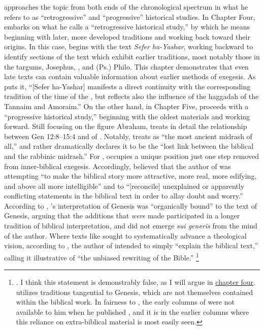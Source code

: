 \vermes approaches the topic from both ends of the chronological spectrum in what he refers to as ``retrogressive'' and ``progressive'' historical studies. In Chapter Four, \vermes embarks on what he calls a ``retrogressive historical study,'' by which he means beginning with later, more developed traditions and working back toward their origins. In this case, \vermes begins with the  text \emph{Sefer ha-Yashar}, working backward to identify sections of the text which exhibit earlier traditions, most notably those in the targums, Josephus, \jub, and (Ps.) Philo. This chapter demonstrates that even late texts can contain valuable information about earlier methods of exegesis. As \vermes puts it, ``[Sefer ha-Yashar] manifests a direct continuity with the corresponding tradition of the time of the \secondtemple, but reflects also the influence of the haggadah of the Tannaim and Amoraim.''%
    \autocite[95]{vermes1961}
On the other hand, in Chapter Five, \vermes proceeds with a ``progressive historical study,'' beginning with the oldest materials and working forward. Still focusing on the figure Abraham, \vermes treats in detail the relationship between Gen 12:8--15:4 and  of \ga. Notably, \vermes treats \ga as ``the most ancient midrash of all,''%
    \autocite[124]{vermes1961}
and rather dramatically declares it to be the ``lost link between the biblical and the rabbinic midrash.''%
    \autocite[124]{vermes1961}
For \vermes, \ga occupies a unique position just one step removed from inner-biblical exegesis. Accordingly, \vermes believed that the author of \ga was attempting ``to make the biblical story more attractive, more real, more edifying, and above all more intelligible'' and to ``[reconcile] unexplained or apparently conflicting statements in the biblical text in order to allay doubt and worry.''%
    \autocite[126]{vermes1961}
According to \vermes, \ga's interpretation of Genesis was ``organically bound'' to the text of Genesis, arguing that the additions that \emph{were} made participated in a longer tradition of biblical interpretation, and did not emerge \emph{sui generis} from the mind of the author. Where texts like \jub sought to systematically advance a theological vision, according to \vermes, the author of \ga intended to simply ``explain the biblical text,'' calling it illustrative of ``the unbiased rewriting of the Bible.''%
    \footnote{%
        \Cite[126]{vermes1961}. I think this statement is demonstrably false, as I will argue in \hyperref[chap:ga]{chapter four}. \GA utilizes traditions tangential to Genesis, which are not themselves contained within the biblical work. In fairness to \vermes, the early columns of \ga were not available to him when he published , and it is in the earlier columns where this reliance on extra-biblical material is most easily seen.}

